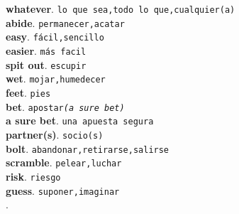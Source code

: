 \documentclass[twocolumn]{article}
\begin{document}
	\textsf{\textbf{whatever}}. \texttt{lo que sea,todo lo que,cualquier(a)}\\
	\textsf{\textbf{abide}}. \texttt{permanecer,acatar}\\
	\textsf{\textbf{easy}}. \texttt{f\'acil,sencillo}\\
	\textsf{\textbf{easier}}. \texttt{m\'as facil}\\
	\textsf{\textbf{spit out}}. \texttt{escupir}\\
	\textsf{\textbf{wet}}. \texttt{mojar,humedecer}\\
	\textsf{\textbf{feet}}. \texttt{pies}\\
	\textsf{\textbf{bet}}. \texttt{apostar{\scriptsize \textit{(a sure bet)}}}\\
	\textsf{\textbf{a sure bet}}. \texttt{una apuesta segura}\\
	\textsf{\textbf{partner(s)}}. \texttt{socio(s)}\\
	\textsf{\textbf{bolt}}. \texttt{abandonar,retirarse,salirse}\\
	\textsf{\textbf{scramble}}. \texttt{pelear,luchar}\\
	\textsf{\textbf{risk}}. \texttt{riesgo}\\
	\textsf{\textbf{guess}}. \texttt{suponer,imaginar}\\
	\textsf{\textbf{}}. \texttt{}\\
\end{document}

